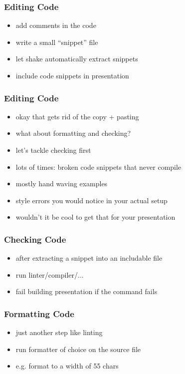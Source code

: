\documentclass{beamer}
\begin{document}
\begin{frame}
  \frametitle{Editing Code}
  \begin{itemize}
  \item add comments in the code
  \item write a small ``snippet'' file
  \item let shake automatically extract snippets
  \item include code snippets in presentation
  \end{itemize}
\end{frame}

\begin{frame}
  \frametitle{Editing Code}
  \begin{itemize}
  \item okay that gets rid of the copy + pasting
  \item what about formatting and checking?
  \item let's tackle checking first
  \item lots of times: broken code snippets that never compile
  \item mostly hand waving examples
  \item style errors you would notice in your actual setup
  \item wouldn't it be cool to get that for your presentation
  \end{itemize}
\end{frame}

\begin{frame}
  \frametitle{Checking Code}
  \begin{itemize}
  \item after extracting a snippet into an includable file
  \item run linter/compiler/...
  \item fail building presentation if the command fails
  \end{itemize}
\end{frame}

\begin{frame}
  \frametitle{Formatting Code}
  \begin{itemize}
  \item just another step like linting
  \item run formatter of choice on the source file
  \item e.g. format to a width of 55 chars
  \end{itemize}
\end{frame}
\end{document}
